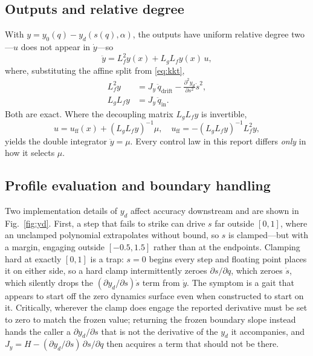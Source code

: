 \documentclass[10pt,conference]{IEEEtran}
\begin{document}
\subsection{Outputs and relative degree}

With $y = y_0(q) - y_d(s(q),\alpha)$, the outputs have uniform relative degree
two---$u$ does not appear in $\dot y$---so
%
\begin{equation}
\ddot y = L_f^2 y(x) + L_g L_f y(x)\, u,
\end{equation}
%
where, substituting the affine split from \eqref{eq:kkt},
%
\begin{align}
L_f^2 y &= J_y\, \ddot q_{\mathrm{drift}} - \tfrac{\partial^2 y_d}{\partial s^2}\dot s^2, \\
L_g L_f y &= J_y\, \ddot q_{\mathrm{in}}.
\end{align}
%
Both are exact. Where the decoupling matrix $L_gL_fy$ is invertible,
%
\begin{equation}
u = u_{\mathrm{ff}}(x) + (L_gL_fy)^{-1}\mu, \quad
u_{\mathrm{ff}} = -(L_gL_fy)^{-1}L_f^2 y,
\label{eq:iolin}
\end{equation}
%
yields the double integrator $\ddot y = \mu$. Every control law in this report
differs \emph{only} in how it selects $\mu$.

\subsection{Profile evaluation and boundary handling}

Two implementation details of $y_d$ affect accuracy downstream and are shown in
Fig.~\ref{fig:yd}. First, a step that fails to strike can drive $s$ far outside
$[0,1]$, where an unclamped polynomial extrapolates without bound, so $s$ is
clamped---but with a margin, engaging outside $[-0.5, 1.5]$ rather than at the
endpoints. Clamping hard at exactly $[0,1]$ is a trap: $s = 0$ begins every
step and floating point places it on either side, so a hard clamp intermittently
zeroes $\partial s/\partial q$, which zeroes $\dot s$, which silently drops the
$(\partial y_d/\partial s)\dot s$ term from $\dot y$. The symptom is a gait that
appears to start off the zero dynamics surface even when constructed to start on
it. Critically, wherever the clamp does engage the reported derivative must be
set to zero to match the frozen value; returning the frozen boundary slope
instead hands the caller a $\partial y_d/\partial s$ that is not the derivative
of the $y_d$ it accompanies, and $J_y = H - (\partial y_d/\partial s)\,
\partial s/\partial q$ then acquires a term that should not be there.
\end{document}
